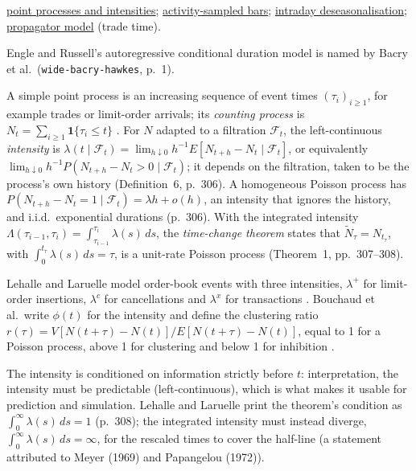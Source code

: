 \begin{qfdefinition}
 \hyperref[def:order-event-point-processes]{point processes and intensities}; \hyperref[meth:activity-sampled-bars]{activity-sampled bars}; \hyperref[meth:intraday-deseasonalisation]{intraday deseasonalisation}; \hyperref[mod:propagator]{propagator model} (trade time).

 Engle and Russell's autoregressive conditional duration model is named by Bacry et al.\ (\nolinkurl{wide-bacry-hawkes}, p.~1).

\end{qfdefinition}

\begin{qfdefinition}\label{def:order-event-point-processes}
 A simple point process is an increasing sequence of event times $(\tau_i)_{i\ge1}$, for example trades or limit-order arrivals; its \emph{counting process} is $N_t=\sum_{i\ge1}\mathbf 1\{\tau_i\le t\}$ \citep[app.~A, sec.~A.12.1, Definitions~3--4, pp.~305--306]{alpha-laruelle}. For $N$ adapted to a filtration $\mathcal F_t$, the left-continuous \emph{intensity} is $\lambda(t\mid\mathcal F_t)=\lim_{h\downarrow0}h^{-1}E[N_{t+h}-N_t\mid\mathcal F_t]$, or equivalently $\lim_{h\downarrow0}h^{-1}P(N_{t+h}-N_t>0\mid\mathcal F_t)$; it depends on the filtration, taken to be the process's own history (Definition~6, p.~306). A homogeneous Poisson process has $P(N_{t+h}-N_t=1\mid\mathcal F_t)=\lambda h+o(h)$, an intensity that ignores the history, and i.i.d.\ exponential durations (p.~306). With the integrated intensity $\Lambda(\tau_{i-1},\tau_i)=\int_{\tau_{i-1}}^{\tau_i}\lambda(s)\,ds$, the \emph{time-change theorem} states that $\tilde N_\tau=N_{t_\tau}$, with $\int_0^{t_\tau}\lambda(s)\,ds=\tau$, is a unit-rate Poisson process (Theorem~1, pp.~307--308).

 Lehalle and Laruelle model order-book events with three intensities, $\lambda^+$ for limit-order insertions, $\lambda^c$ for cancellations and $\lambda^x$ for transactions \citep[chap.~3, p.~221]{alpha-laruelle}. Bouchaud et al.\ write $\phi(t)$ for the intensity and define the clustering ratio $r(\tau)=V[N(t+\tau)-N(t)]/E[N(t+\tau)-N(t)]$, equal to 1 for a Poisson process, above 1 for clustering and below 1 for inhibition \citep[chap.~9, secs.~9.1--9.1.2, pp.~164--165]{catalogue-0528}.

 The intensity is conditioned on information strictly before $t$: interpretation, the intensity must be predictable (left-continuous), which is what makes it usable for prediction and simulation. Lehalle and Laruelle print the theorem's condition as $\int_0^\infty\lambda(s)\,ds=1$ (p.~308); the integrated intensity must instead diverge, $\int_0^\infty\lambda(s)\,ds=\infty$, for the rescaled times to cover the half-line (a statement attributed to Meyer (1969) and Papangelou (1972)).


\end{qfdefinition}
